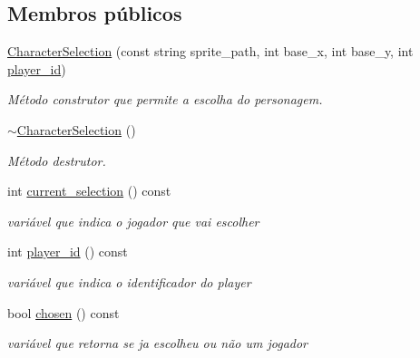 \subsection*{Membros públicos}
\begin{DoxyCompactItemize}
\item 
\mbox{\hyperlink{classCharacterSelection_ac3cb2219a5eda202ecc9a17218326073}{Character\+Selection}} (const string sprite\+\_\+path, int base\+\_\+x, int base\+\_\+y, int \mbox{\hyperlink{classCharacterSelection_add606b028ba88000e1920d4f10992934}{player\+\_\+id}})
\begin{DoxyCompactList}\small\item\em Método construtor que permite a escolha do personagem. \end{DoxyCompactList}\item 
\mbox{\label{classCharacterSelection_ace651140d3df740be6c26fb984ce5f7f}} 
\mbox{\hyperlink{classCharacterSelection_ace651140d3df740be6c26fb984ce5f7f}{$\sim$\+Character\+Selection}} ()
\begin{DoxyCompactList}\small\item\em Método destrutor. \end{DoxyCompactList}\item 
\mbox{\label{classCharacterSelection_a900358acbdbd8ee33da089014f3ab8bb}} 
int \mbox{\hyperlink{classCharacterSelection_a900358acbdbd8ee33da089014f3ab8bb}{current\+\_\+selection}} () const
\begin{DoxyCompactList}\small\item\em variável que indica o jogador que vai escolher \end{DoxyCompactList}\item 
\mbox{\label{classCharacterSelection_add606b028ba88000e1920d4f10992934}} 
int \mbox{\hyperlink{classCharacterSelection_add606b028ba88000e1920d4f10992934}{player\+\_\+id}} () const
\begin{DoxyCompactList}\small\item\em variável que indica o identificador do player \end{DoxyCompactList}\item 
\mbox{\label{classCharacterSelection_ab6f27f44a433da27c786b25b9c4945ca}} 
bool \mbox{\hyperlink{classCharacterSelection_ab6f27f44a433da27c786b25b9c4945ca}{chosen}} () const
\begin{DoxyCompactList}\small\item\em variável que retorna se ja escolheu ou não um jogador \end{DoxyCompactList}\end{DoxyCompactItemize}
